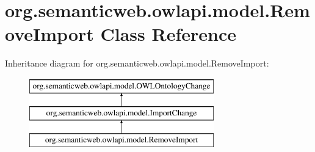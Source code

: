 \hypertarget{classorg_1_1semanticweb_1_1owlapi_1_1model_1_1_remove_import}{\section{org.\-semanticweb.\-owlapi.\-model.\-Remove\-Import Class Reference}
\label{classorg_1_1semanticweb_1_1owlapi_1_1model_1_1_remove_import}
}
Inheritance diagram for org.\-semanticweb.\-owlapi.\-model.\-Remove\-Import\-:\begin{figure}[H]
\begin{center}
\leavevmode
\includegraphics[height=3.000000cm]{classorg_1_1semanticweb_1_1owlapi_1_1model_1_1_remove_import}
\end{center}
\end{figure}
